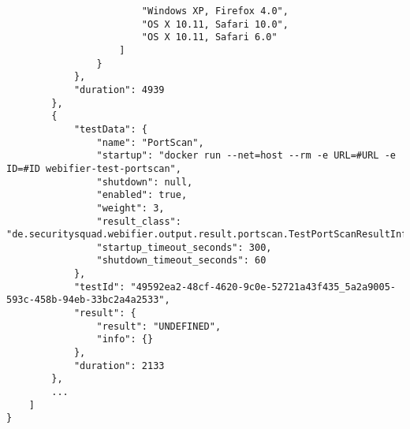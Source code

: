 \begin{scriptsize}
\begin{lstlisting}
                        "Windows XP, Firefox 4.0",
                        "OS X 10.11, Safari 10.0",
                        "OS X 10.11, Safari 6.0"
                    ]
                }
            },
            "duration": 4939
        },
        {
            "testData": {
                "name": "PortScan",
                "startup": "docker run --net=host --rm -e URL=#URL -e ID=#ID webifier-test-portscan",
                "shutdown": null,
                "enabled": true,
                "weight": 3,
                "result_class": "de.securitysquad.webifier.output.result.portscan.TestPortScanResultInfo",
                "startup_timeout_seconds": 300,
                "shutdown_timeout_seconds": 60
            },
            "testId": "49592ea2-48cf-4620-9c0e-52721a43f435_5a2a9005-593c-458b-94eb-33bc2a4a2533",
            "result": {
                "result": "UNDEFINED",
                "info": {}
            },
            "duration": 2133
        },
        ...
    ]
}
\end{lstlisting}
\end{scriptsize}
